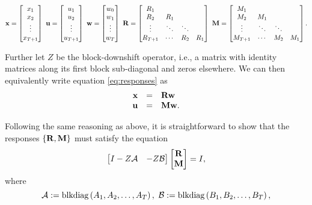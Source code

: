 \documentclass[11pt]{article}
\numberwithin{equation}{section}
\begin{document}
\begin{equation}
\mathbf{x} = \begin{bmatrix} x_1 \\ x_2 \\ \vdots \\ x_{T+1} \end{bmatrix} \ \mathbf{u} = \begin{bmatrix} u_1 \\ u_2 \\ \vdots \\ u_{T+1} \end{bmatrix} \ \mathbf{w} = \begin{bmatrix} w_0 \\ w_1 \\ \vdots \\ w_T\end{bmatrix} \ \mathbf{R} = \begin{bmatrix} R_1 & & & \\ R_2 & R_1 & & \\ \vdots & \ddots & \ddots & \\  R_{T+1} & \cdots & R_2 & R_1 \end{bmatrix} \ \mathbf{M} = \begin{bmatrix} M_1 & & & \\ M_2 & M_1 & & \\ \vdots & \ddots & \ddots & \\  M_{T+1} & \cdots & M_2 & M_1 \end{bmatrix} \label{eq:definitions}.
\end{equation}

Further let $Z$ be the block-downshift operator, i.e., a matrix with identity matrices along its first block sub-diagonal and zeros elsewhere.  We can then equivalently write equation \eqref{eq:responses} as
\begin{equation}
\begin{array}{rcl}
\mathbf{x} &=& \mathbf{R} \mathbf{w} \\
\mathbf{u} &=& \mathbf{M} \mathbf{w}.
\label{eq:toep_resp}
\end{array}
\end{equation}

Following the same reasoning as above, it is straightforward to show that the responses $\{\mathbf{R}, \mathbf{M}\}$ must satisfy the equation
\begin{equation}
\begin{bmatrix} I - Z\mathcal{A} & -Z\mathcal{B} \end{bmatrix}\begin{bmatrix} \mathbf{R} \\ \mathbf{M} \end{bmatrix} = I,
\label{eq:subspace}
\end{equation}
where
\begin{equation}
\mathcal{A} := \mathrm{blkdiag}\left(A_1,A_2,\dots,A_T\right), \ \mathcal{B} := \mathrm{blkdiag}\left(B_1,B_2,\dots,B_T\right),
\end{equation}
\end{document}
